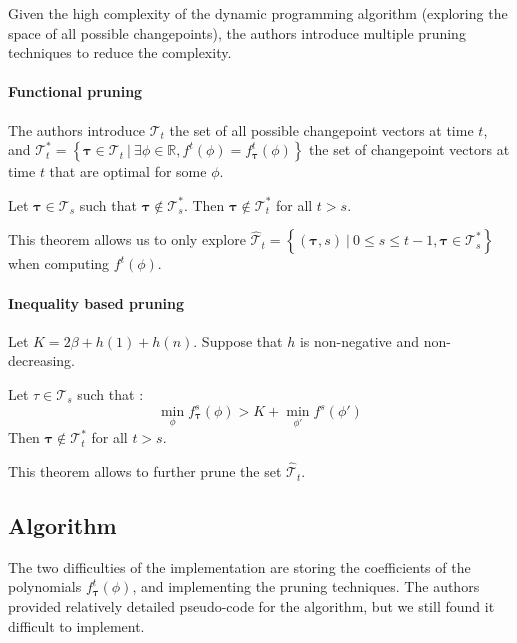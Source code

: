 \documentclass[11pt]{article}
\begin{document}
Given the high complexity of the dynamic programming algorithm (exploring the space of all possible changepoints), the authors introduce multiple pruning techniques to reduce the complexity.

\paragraph*{Functional pruning} The authors introduce $\mathcal{T}_t$ the set of all possible changepoint vectors at time $t$, and $\mathcal{T}_t^*=\left\{\boldsymbol{\tau}\in \mathcal{T}_t \:\big|\: \exists\phi\in\mathbb{R}, f^t(\phi)=f_{\boldsymbol{\tau}}^t(\phi)\right\}$ the set of changepoint vectors at time $t$ that are optimal for some $\phi$.

\begin{theorem}
    \label{th:functional_pruning}
    Let $\boldsymbol{\tau}\in\mathcal{T}_s$ such that $\boldsymbol{\tau}\notin \mathcal{T}_s^*$. Then $\boldsymbol{\tau}\notin \mathcal{T}_t^*$ for all $t>s$.
\end{theorem}

This theorem allows us to only explore $\hat{\mathcal{T}}_t=\left\{(\boldsymbol{\tau},s)\:\big|\: 0\leq s\leq t-1, \boldsymbol{\tau}\in \mathcal{T}_s^*\right\}$ when computing $f^t(\phi)$.

\paragraph*{Inequality based pruning} Let $K=2\beta+h(1)+h(n)$. Suppose that $h$ is non-negative and non-decreasing.

\begin{theorem}
    Let $\tau\in\mathcal{T}_s$ such that :
    $$\min_\phi f_{\boldsymbol{\tau}}^s(\phi) > K + \min_{\phi'} f^s(\phi')$$
    Then $\boldsymbol{\tau}\notin \mathcal{T}_t^*$ for all $t>s$.
\end{theorem}

This theorem allows to further prune the set $\hat{\mathcal{T}}_t$.

\subsection{Algorithm}

The two difficulties of the implementation are storing the coefficients of the polynomials $f^t_{\boldsymbol{\tau}}(\phi)$, and implementing the pruning techniques. The authors provided relatively detailed pseudo-code for the algorithm, but we still found it difficult to implement.
\end{document}
